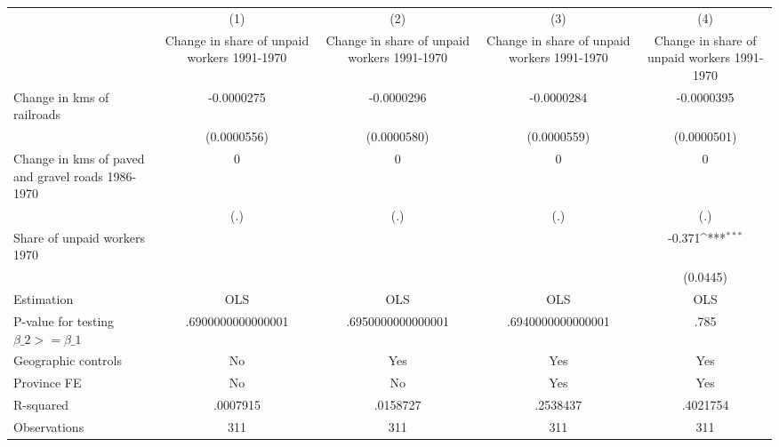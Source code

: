 {
\def\sym#1{\ifmmode^{#1}\else\(^{#1}\)\fi}
\begin{tabular}{l*{4}{c}}
\hline\hline
                &\multicolumn{1}{c}{(1)}&\multicolumn{1}{c}{(2)}&\multicolumn{1}{c}{(3)}&\multicolumn{1}{c}{(4)}\\
                &\multicolumn{1}{c}{Change in share of unpaid workers 1991-1970}&\multicolumn{1}{c}{Change in share of unpaid workers 1991-1970}&\multicolumn{1}{c}{Change in share of unpaid workers 1991-1970}&\multicolumn{1}{c}{Change in share of unpaid workers 1991-1970}\\
\hline
Change in kms of railroads&-0.0000275         &-0.0000296         &-0.0000284         &-0.0000395         \\
                &(0.0000556)         &(0.0000580)         &(0.0000559)         &(0.0000501)         \\
[1em]
Change in kms of paved and gravel roads 1986-1970&        0         &        0         &        0         &        0         \\
                &      (.)         &      (.)         &      (.)         &      (.)         \\
[1em]
Share of unpaid workers 1970&                  &                  &                  &   -0.371\sym{***}\\
                &                  &                  &                  & (0.0445)         \\
\hline
Estimation      &      OLS         &      OLS         &      OLS         &      OLS         \\
P-value for testing $\beta\_2 >= \beta\_1$&.6900000000000001         &.6950000000000001         &.6940000000000001         &     .785         \\
Geographic controls&       No         &      Yes         &      Yes         &      Yes         \\
Province FE     &       No         &       No         &      Yes         &      Yes         \\
R-squared       & .0007915         & .0158727         & .2538437         & .4021754         \\
Observations    &      311         &      311         &      311         &      311         \\
\hline\hline
\end{tabular}
}
